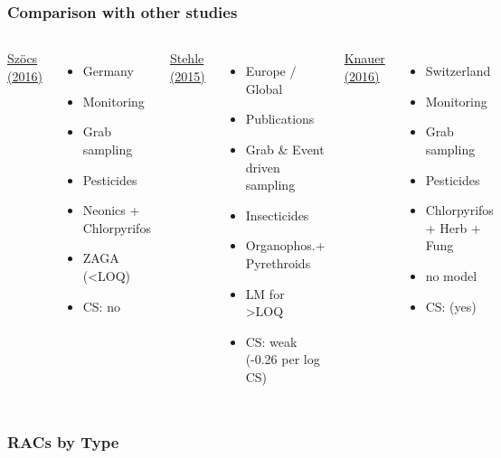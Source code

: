 \documentclass[
	12pt
	]{beamer}
\begin{document}
\begin{frame}[shrink]
\frametitle{Comparison with other studies}
	\begin{columns}[T]
	    \underline{Szöcs (2016)}
	    \begin{itemize}
        	\item Germany \\[1.5em]
        	\item Monitoring
        	\item Grab sampling \vspace{1.2em}
        	\item Pesticides
        	\item Neonics + Chlorpyrifos
        	\item ZAGA (\textless LOQ)
        	\item CS: no
        \end{itemize}
	    \underline{Stehle (2015)}
	    \begin{itemize}
        	\item Europe / Global
        	\item Publications
        	\item Grab \& Event driven sampling
        	\item Insecticides
        	\item Organophos.+ Pyrethroids
        	\item LM for \textgreater LOQ
        	\item CS: weak (-0.26 per log CS)
        \end{itemize}
	    \underline{Knauer (2016)}
	    \begin{itemize}
        	\item Switzerland \\[1.5em]
        	\item Monitoring
        	\item Grab sampling \vspace{1.2em}
        	\item Pesticides
        	\item Chlorpyrifos + Herb + Fung 
        	\item no model
        	\item CS: (yes)
        \end{itemize}
	\end{columns}
\end{frame}


\begin{frame}
\frametitle{RACs by Type}
	\begin{adjustbox}{max totalsize={\textwidth}{0.95\textheight}}
				
	\end{adjustbox}
\end{frame}
\end{document}

